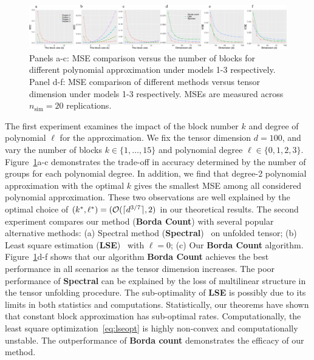 \documentclass{article}
\theoremstyle{definition}
\begin{document}
\vspace{-.3cm}
\begin{figure}[htp]
    \centering
    \includegraphics[width =\textwidth]{figures/sim.pdf}    
    \caption{Panels a-c: MSE comparison versus the number of blocks for different polynomial approximation under models 1-3 respectively.  Panel d-f:  MSE comparison of different methods versus tensor dimension under models 1-3 respectively. MSEs are measured across $n_{\text{sim}} = 20$ replications.}
    \label{fig:degk}
    \vspace{-.3cm}
\end{figure}

The first experiment examines the impact of the block number $k$ and degree of polynomial $\ell$ for the approximation. We fix the tensor dimension $d = 100$, and vary the number of blocks $k\in\{1,\ldots,15\}$ and polynomial degree $\ell\in\{0,1,2,3\}.$
Figure~\ref{fig:degk}a-c demonstrates the trade-off in accuracy determined by the number of groups for each polynomial degree. In addition, we find that degree-2 polynomial approximation with the optimal $k$ gives the smallest MSE among all considered polynomial approximation. These two observations are well explained by the optimal choice of $(k^*,\ell^*) = (\mathcal{O}(\lceil d^{3/7}\rceil,2)$ in our theoretical results. 
The second experiment compares our method ({\bf \small Borda Count}) with several popular alternative methods: (a) Spectral method ({\bf \small Spectral})~\citep{xu2018rates} on unfolded tensor; (b) Least square estimation ({\bf \small LSE})~\cite{balasubramanian2021nonparametric} with $\ell=0$; (c) Our {\bf \small Borda Count} algorithm. 
Figure~\ref{fig:degk}d-f shows that our algorithm {\bf \small Borda Count} achieves the best performance in all scenarios as the tensor dimension increases. The poor performance of {\bf \small Spectral} can be explained by the loss of multilinear structure in the tensor unfolding procedure. The sub-optimality of {\bf \small LSE} is possibly due to its limits in both statistics and computations. Statistically, our theorems have shown that constant block approximation has sub-optimal rates. Computationally, the least square optimization~\eqref{eq:lseopt} is highly non-convex and computationally unstable. The outperformance of {\bf \small Borda count} demonstrates the efficacy of our method.
\end{document}
